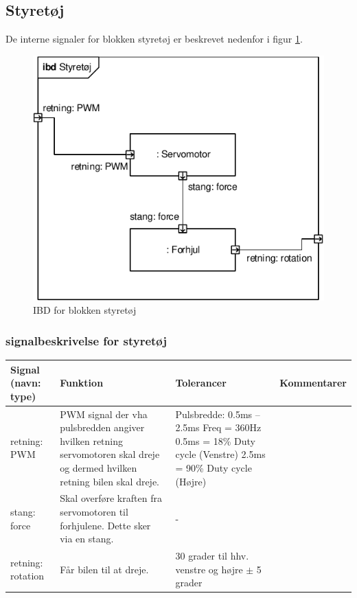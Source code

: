 \subsection{Styretøj}

De interne signaler for blokken styretøj er beskrevet nedenfor i figur \ref{fig:ibd_styretoej}.

\begin{figure}[h]
\centering
\includegraphics[scale=1]{../fig/diagrammer/bil/ibd_styretoej.pdf}
\caption{IBD for blokken styretøj}
\label{fig:ibd_styretoej}
\end{figure}

\subsubsection{signalbeskrivelse for styretøj}

\begin{table}[h]
	\centering
	\begin{tabularx}{\textwidth}{|l|X|X|X|} \hline
	\textbf{Signal (navn: type)} & \textbf{Funktion} & \textbf{Tolerancer} & \textbf{Kommentarer} \\ \hline
retning: PWM 
	& PWM signal der vha pulsbredden angiver hvilken retning servomotoren skal dreje og dermed hvilken retning bilen skal dreje. 
	& Pulsbredde: 0.5ms – 2.5ms \newline
		Freq = 360Hz \newline
		0.5ms = 18\% Duty cycle (Venstre)\newline
		2.5ms = 90\% Duty cycle (Højre)
	& ~
	\\ \hline
stang: force 
	& Skal overføre kraften fra servomotoren til forhjulene. Dette sker via en stang.
	& -
	& ~
	\\ \hline
retning: rotation
	& Får bilen til at dreje.
	& 30 grader til hhv. venstre og højre $\pm$ 5 grader
	& ~
	\\ \hline
	\end{tabularx}
\end{table}